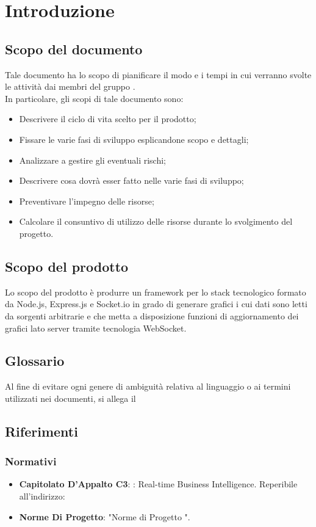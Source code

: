 \section{Introduzione}
	\subsection{Scopo del documento}
		Tale documento ha lo scopo di pianificare il modo e i tempi in cui verranno svolte le attività dai membri del gruppo \groupname{}. \\In particolare, gli scopi di tale documento sono:
		\begin{itemize}
			\item Descrivere il ciclo di vita scelto per il prodotto;
			\item Fissare le varie fasi di sviluppo esplicandone scopo e dettagli;
			\item Analizzare a gestire gli eventuali rischi;
			\item Descrivere cosa dovrà esser fatto nelle varie fasi di sviluppo;
			\item Preventivare l'impegno delle risorse;
			\item Calcolare il consuntivo di utilizzo delle risorse durante lo svolgimento del progetto.
		\end{itemize}
	\subsection{Scopo del prodotto}
		Lo scopo del prodotto è produrre un framework per lo stack tecnologico formato da Node.js, Express.js e Socket.io in grado di generare grafici i cui dati sono letti da sorgenti arbitrarie e che metta a disposizione funzioni di aggiornamento dei grafici lato server tramite tecnologia WebSocket.
	\subsection{Glossario}
		Al fine di evitare ogni genere di ambiguità relativa al linguaggio o ai termini utilizzati nei documenti, si allega il 
	\subsection{Riferimenti}
		\subsubsection{Normativi}
			\begin{itemize}
				\item\textbf{Capitolato D'Appalto C3}: \projectname{}: Real-time Business Intelligence. Reperibile all'indirizzo: 
				\item\textbf{Norme Di Progetto}: "Norme di Progetto \lastversion".
			\end{itemize}
